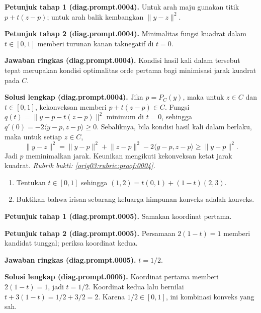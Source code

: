 \par\noindent\textbf{Petunjuk tahap 1 (diag.prompt.0004).}
Untuk arah maju gunakan titik $p+t(z-p)$; untuk arah balik kembangkan
$\lVert y-z\rVert^2$.
\label{orig03:diag:hint1:0004}
\par\noindent\textbf{Petunjuk tahap 2 (diag.prompt.0004).}
Minimalitas fungsi kuadrat dalam $t\in[0,1]$ memberi turunan kanan taknegatif
di $t=0$.
\label{orig03:diag:hint2:0004}
\par\noindent\textbf{Jawaban ringkas (diag.prompt.0004).}
Kondisi hasil kali dalam tersebut tepat merupakan kondisi optimalitas orde
pertama bagi minimisasi jarak kuadrat pada $C$.
\label{orig03:diag:answer:0004}
\par\noindent\textbf{Solusi lengkap (diag.prompt.0004).}
Jika $p=P_C(y)$, maka untuk $z\in C$ dan $t\in[0,1]$, kekonveksan memberi
$p+t(z-p)\in C$. Fungsi
$q(t)=\lVert y-p-t(z-p)\rVert^2$ minimum di $t=0$, sehingga
$q'(0)=-2\langle y-p,z-p\rangle\geq0$. Sebaliknya, bila kondisi hasil kali
dalam berlaku, maka untuk setiap $z\in C$,
\[
\lVert y-z\rVert^2
=\lVert y-p\rVert^2+\lVert z-p\rVert^2
-2\langle y-p,z-p\rangle\geq\lVert y-p\rVert^2.
\]
Jadi $p$ meminimalkan jarak. Keunikan mengikuti kekonveksan ketat jarak
kuadrat.
\emph{Rubrik bukti: \ref{orig03:rubric:proof:0004}.}
\label{orig03:diag:solution:0004}

\begin{exercise}
\label{orig03:diag:problem:0003}
\begin{enumerate}
\item\label{orig03:diag:prompt:0005}
Tentukan $t\in[0,1]$ sehingga
$(1,2)=t(0,1)+(1-t)(2,3)$.
\item\label{orig03:diag:prompt:0006}
Buktikan bahwa irisan sebarang keluarga himpunan konveks adalah konveks.
\end{enumerate}
\end{exercise}

\par\noindent\textbf{Petunjuk tahap 1 (diag.prompt.0005).}
Samakan koordinat pertama.
\label{orig03:diag:hint1:0005}
\par\noindent\textbf{Petunjuk tahap 2 (diag.prompt.0005).}
Persamaan $2(1-t)=1$ memberi kandidat tunggal; periksa koordinat kedua.
\label{orig03:diag:hint2:0005}
\par\noindent\textbf{Jawaban ringkas (diag.prompt.0005).}
$t=1/2$.
\label{orig03:diag:answer:0005}
\par\noindent\textbf{Solusi lengkap (diag.prompt.0005).}
Koordinat pertama memberi $2(1-t)=1$, jadi $t=1/2$. Koordinat kedua lalu
bernilai $t+3(1-t)=1/2+3/2=2$. Karena $1/2\in[0,1]$, ini kombinasi konveks
yang sah.
\label{orig03:diag:solution:0005}

